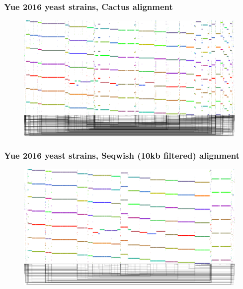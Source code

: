 \documentclass[aspectratio=169]{beamer}
\begin{document}
\begin{frame}[fragile]
  \frametitle{Yue 2016 yeast strains, Cactus alignment}
  \begin{figure}
    \includegraphics[scale=0.08,center]{cactus-yeast-dg.png}
  \end{figure}
\end{frame}

\begin{frame}[fragile]
  \frametitle{Yue 2016 yeast strains, Seqwish (10kb filtered) alignment}
  \begin{figure}
    \includegraphics[scale=0.08,center]{seqwish-yeast-l10k-sort-dg.png}
  \end{figure}
\end{frame}
\end{document}
